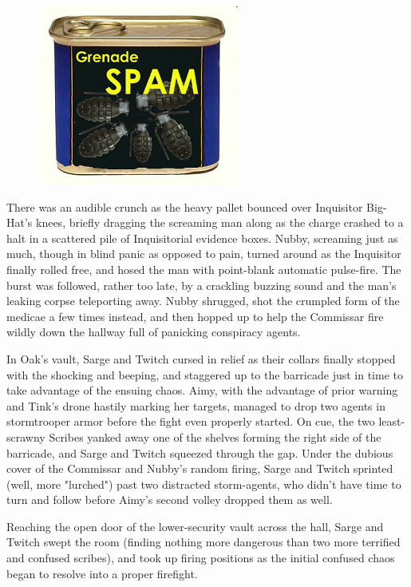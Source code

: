 \begin{figure}
	\begin{center}
		\includegraphics[width=\figwidth]{pics/21/104.png}
	\end{center}
\end{figure}
There was an audible crunch as the heavy pallet bounced over Inquisitor Big-Hat's knees, briefly dragging the screaming man along as the charge crashed to a halt in a scattered pile of Inquisitorial evidence boxes. 
Nubby, screaming just as much, though in blind panic as opposed to pain, turned around as the Inquisitor finally rolled free, and hosed the man with point-blank automatic pulse-fire. 
The burst was followed, rather too late, by a crackling buzzing sound and the man's leaking corpse teleporting away. 
Nubby shrugged, shot the crumpled form of the medicae a few times instead, and then hopped up to help the Commissar fire wildly down the hallway full of panicking conspiracy agents.

In Oak's vault, Sarge and Twitch cursed in relief as their collars finally stopped with the shocking and beeping, and staggered up to the barricade just in time to take advantage of the ensuing chaos. 
Aimy, with the advantage of prior warning and Tink's drone hastily marking her targets, managed to drop two agents in stormtrooper armor before the fight even properly started. 
On cue, the two least-scrawny Scribes yanked away one of the shelves forming the right side of the barricade, and Sarge and Twitch squeezed through the gap. 
Under the dubious cover of the Commissar and Nubby's random firing, Sarge and Twitch sprinted (well, more "lurched") past two distracted storm-agents, who didn't have time to turn and follow before Aimy's second volley dropped them as well. 


Reaching the open door of the lower-security vault across the hall, Sarge and Twitch swept the room (finding nothing more dangerous than two more terrified and confused scribes), and took up firing positions as the initial confused chaos began to resolve into a proper firefight.

